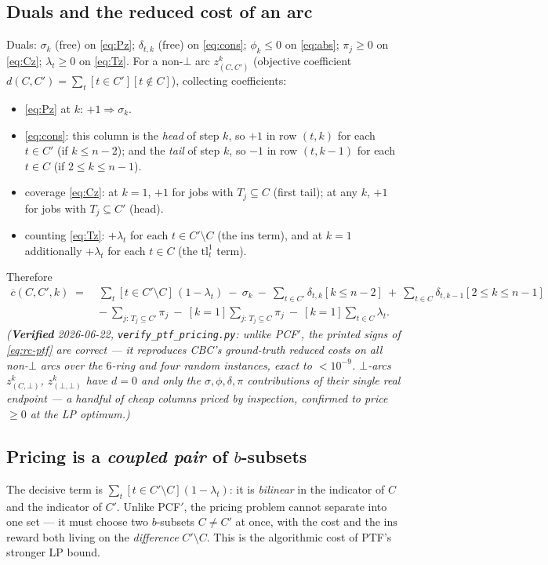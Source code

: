 \documentclass[11pt,a4paper]{article}
\theoremstyle{plain}
\theoremstyle{definition}
\newcommand{\RC}{\overline{c}}
\newcommand{\tl}{\mathrm{tl}}
\newcommand{\ins}{\mathrm{ins}}
\begin{document}
\subsection{Duals and the reduced cost of an arc}
Duals: $\sigma_k$ (free) on \eqref{eq:Pz}; $\delta_{t,k}$ (free) on \eqref{eq:cons};
$\phi_k\le0$ on \eqref{eq:abs}; $\pi_j\ge0$ on \eqref{eq:Cz}; $\lambda_t\ge0$ on \eqref{eq:Tz}.
For a non-$\bot$ arc $z^k_{(C,C')}$ (objective coefficient $d(C,C')=\sum_t[t\in C'][t\notin C]$),
collecting coefficients:
\begin{itemize}
\item \eqref{eq:Pz} at $k$: $+1\Rightarrow\sigma_k$.
\item \eqref{eq:cons}: this column is the \emph{head} of step $k$, so $+1$ in row $(t,k)$ for each
      $t\in C'$ (if $k\le n-2$); and the \emph{tail} of step $k$, so $-1$ in row $(t,k{-}1)$ for
      each $t\in C$ (if $2\le k\le n-1$).
\item coverage \eqref{eq:Cz}: at $k=1$, $+1$ for jobs with $T_j\subseteq C$ (first tail); at any
      $k$, $+1$ for jobs with $T_j\subseteq C'$ (head).
\item counting \eqref{eq:Tz}: $+\lambda_t$ for each $t\in C'\setminus C$ (the $\ins$ term), and at
      $k=1$ additionally $+\lambda_t$ for each $t\in C$ (the $\tl_t^1$ term).
\end{itemize}
Therefore
\begin{equation}\label{eq:rc-ptf}
\begin{aligned}
  \RC(C,C',k)\;=\;&\sum_{t}[t\in C'\setminus C]\,(1-\lambda_t)\ -\ \sigma_k
   \ -\ \sum_{t\in C'}\delta_{t,k}[k\le n-2]\ +\ \sum_{t\in C}\delta_{t,k-1}[2\le k\le n-1]\\
   &-\ \sum_{j:\,T_j\subseteq C'}\pi_j\ -\ [k=1]\sum_{j:\,T_j\subseteq C}\pi_j\ -\ [k=1]\sum_{t\in C}\lambda_t.
\end{aligned}
\end{equation}
\emph{(\textbf{Verified} 2026-06-22, \texttt{verify\_ptf\_pricing.py}: unlike PCF$'$, the printed
signs of \eqref{eq:rc-ptf} are correct --- it reproduces CBC's ground-truth reduced costs on all
non-$\bot$ arcs over the $6$-ring and four random instances, exact to $<10^{-9}$. $\bot$-arcs
$z^k_{(C,\bot)}$, $z^k_{(\bot,\bot)}$ have $d=0$ and only the $\sigma,\phi,\delta,\pi$
contributions of their single real endpoint --- a handful of cheap columns priced by inspection,
confirmed to price $\ge0$ at the LP optimum.)}

\subsection{Pricing is a \emph{coupled pair} of $b$-subsets}
The decisive term is $\sum_t[t\in C'\setminus C](1-\lambda_t)$: it is \emph{bilinear} in the
indicator of $C$ and the indicator of $C'$. Unlike PCF$'$, the pricing problem cannot separate
into one set --- it must choose two $b$-subsets $C\neq C'$ at once, with the cost and the $\ins$
reward both living on the \emph{difference} $C'\setminus C$. This is the algorithmic cost of
PTF's stronger LP bound.
\end{document}
